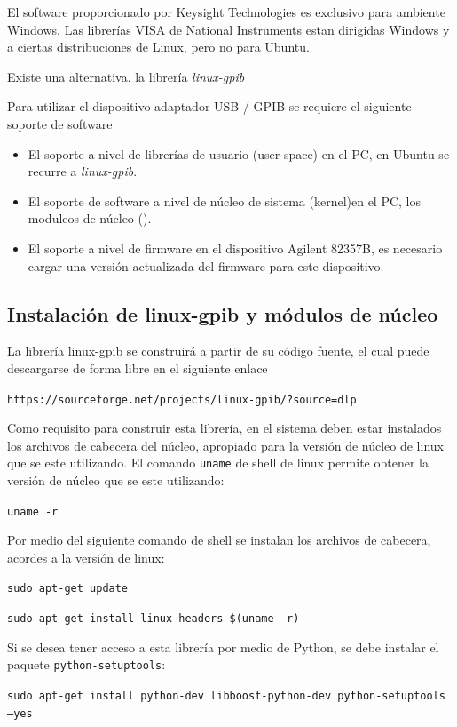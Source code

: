 \documentclass[paper=letter,oneside,fontsize=11pt, parskip=full]{scrartcl}
\begin{document}
		El software proporcionado por Keysight Technologies es exclusivo para ambiente Windows. Las librerías VISA de National Instruments estan dirigidas Windows y a ciertas distribuciones de Linux, pero no para Ubuntu.
		
		Existe una alternativa, la librería \emph{linux-gpib} 
		
		Para utilizar el dispositivo adaptador USB / GPIB se requiere el siguiente soporte de software
		
		\begin{itemize}
			\item El soporte a nivel de librerías de usuario (user space) en el PC, en Ubuntu se recurre a \emph{linux-gpib}.
			\item El soporte de software a nivel de núcleo de sistema (kernel)en el PC, los moduleos de núcleo ().
			\item El soporte a nivel de firmware en el dispositivo Agilent 82357B, es necesario cargar una versión actualizada del firmware para este dispositivo.
		\end{itemize}
	
		\subsection{Instalación de linux-gpib y módulos de núcleo}
		
		La librería linux-gpib se construirá a partir de su código fuente, el cual puede descargarse de forma libre en el siguiente enlace
		
		\texttt{https://sourceforge.net/projects/linux-gpib/?source=dlp}
		
		Como requisito para construir esta librería, en el sistema deben estar instalados los archivos de cabecera del núcleo, apropiado para la versión de núcleo de linux que se este utilizando. El comando \texttt{uname} de shell de linux permite obtener la versión de núcleo que se este utilizando:
		
		\texttt{uname -r}
		
		Por medio del siguiente comando de shell se instalan los archivos de cabecera, acordes a la versión de linux:
		
		\texttt{sudo apt-get update}
		
		\texttt{sudo apt-get install linux-headers-\$(uname -r)}
		
		Si se desea tener acceso a esta librería por medio de Python, se debe instalar el paquete \texttt{python-setuptools}: 
		
		\texttt{sudo apt-get install python-dev libboost-python-dev python-setuptools --yes}
		
\end{document}
